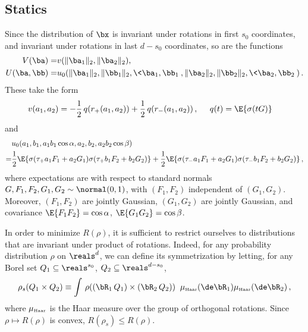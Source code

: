 \documentclass[11pt]{article}
\begin{document}
\subsection{Statics}

Since the distribution of $\bx$ is invariant under rotations in first $s_0$ coordinates, and invariant under rotations in last $d - s_0$ coordinates, so are the functions 
\begin{align}
V(\ba) =& v(\| \ba_1 \|_2, \| \ba_2 \|_2), \\
U(\ba, \bb)=&  u_0(\|\ba_1\|_2, \|\bb_1\|_2,\<\ba_1,\bb_1\>, \| \ba_2 \|_2, \| \bb_2 \|_2, \< \ba_2, \bb_2\> )\,.
\end{align}
These take the form
\[
\begin{aligned}
v(a_1, a_2) & = -\frac{1}{2}\, q(r_+(a_1, a_2))+\frac{1}{2}\, q(r_-(a_1, a_2))\, ,\;\;\;\;\; q(t) =\E\{\sigma( t G)\}
\end{aligned}
\]
and
\[
\begin{aligned}
&u_0(a_1,b_1,a_1b_1\cos\alpha, a_2, b_2, a_2b_2\cos\beta) \\
= &\frac{1}{2}\E\{\sigma(\tau_{+} a_1 F_1 +  a_2 G_1) \sigma(\tau_{+} b_1 F_2 + b_2 G_2)\} +\frac{1}{2}\E\{\sigma(\tau_{-} a_1 F_1 + a_2 G_1) \sigma(\tau_{-} b_1 F_2 + b_2 G_2)\}\, ,
\end{aligned}
\]
where expectations are with respect to standard normals $G,F_1,F_2, G_1, G_2\sim\normal(0,1)$, with $(F_1, F_2)$ independent of $(G_1, G_2)$. Moreover, $(F_1, F_2)$ are jointly Gaussian, $(G_1, G_2)$ are jointly Gaussian, and covariance $\E\{ F_1 F_2\} = \cos \alpha$, $\E\{G_1 G_2\} = \cos\beta$. 


In order to minimize $R(\rho)$, it is sufficient to restrict ourselves to distributions  that are invariant under
product of rotations. Indeed, for any probability distribution $\rho$ on $\reals^d$, we can define its symmetrization by letting,
for any Borel set $Q_1 \subseteq \reals^{s_0}$, $Q_2 \subseteq \reals^{d - s_0}$,
%
\begin{align}
%
\rho_s(Q_1 \times Q_2) \equiv \int\, \rho((\bR_1 \, Q_1) \times (\bR_2 \, Q_2)) \;\;  \mu_{\mbox{\tiny\rm Haar}} (\de \bR_1) \mu_{\mbox{\tiny \rm Haar}}(\de \bR_2)\, ,
%
\end{align}
%
where $\mu_{\mbox{\tiny\rm Haar}}$ is the Haar measure over the group of orthogonal rotations. Since $\rho\mapsto R(\rho)$ is 
convex, $R(\rho_s)\le R(\rho)$.
\end{document}
